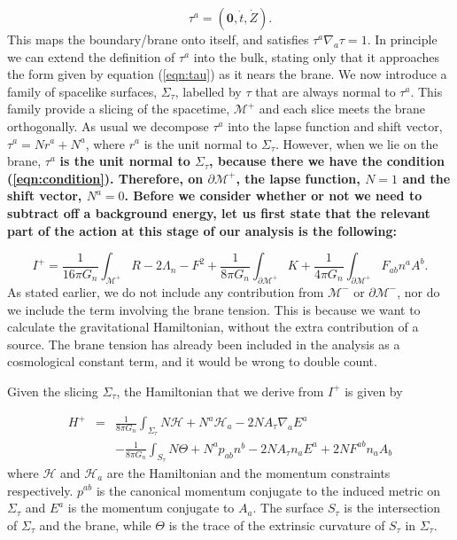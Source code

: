 \documentclass[a4paper,12pt]{article}
\begin{document}
\begin{equation} \label{eqn:tau}
\tau^a=(\mathbf{0}, \dot{t}, \dot{Z}).
\end{equation}
This maps the boundary/brane onto itself, and satisfies $\tau^a
\nabla_a \tau=1$.  In principle we can extend the definition of
$\tau^a$ into the bulk, stating only that it approaches the form given
by equation (\ref{eqn:tau}) as it nears the brane. We now introduce a
family of spacelike surfaces, $\Sigma_\tau$, labelled by $\tau$ that
are always normal to $\tau^a$. This family provide a slicing of the
spacetime, $\mathcal{M}^+$ and each slice meets the brane
orthogonally. As usual we decompose $\tau^a$ into the lapse function
and shift vector, $\tau^a=N r^a +N^a$, where $r^a$ is the unit normal
to $\Sigma_\tau$. However, when we lie on the brane, $\tau^a$ \bf{is}
\rm the unit normal to $\Sigma_\tau$, because there we have the
condition (\ref{eqn:condition}). Therefore, on $\partial
\mathcal{M}^+$, the lapse function, $N=1$ and the shift vector,
$N^a=0$. Before we consider whether or not we need to subtract off a
background energy, let us first state that the relevant part of the
action at this stage of our analysis is the following:

\begin{equation}
I^+ =  \frac{1}{16\pi G_n}\int_{\mathcal{M}^+} R - 2\Lambda_n - F^2 +
\frac{1}{8\pi G_n}\int_{\partial \mathcal{M}^+}  K  + \frac{1}{4\pi
G_n}\int_{\partial\mathcal{M}^+} F_{a b} n^a A^b.
\end{equation}
As stated earlier, we do not include any contribution from
$\mathcal{M}^-$ or $\partial \mathcal{M}^-$, nor do we include the
term involving the brane tension. This is because we want to calculate
the gravitational Hamiltonian, without the extra contribution of a
source. The brane tension has already been included in the analysis as
a cosmological constant term, and it would be wrong to double count.

Given the slicing $\Sigma_\tau$, the Hamiltonian that we derive from
$I^+$ is given by

\begin{eqnarray} \label{eqn:hamiltonian}
H^+ &=& \frac{1}{8 \pi G_n} \int_{\Sigma_{\tau}} N\mathcal{H} + N^a
\mathcal{H}_a - 2NA_{\tau} \nabla_a E^a \nonumber \\ & & -\frac{1}{8
\pi G_n} \int_{S_{\tau}} N \Theta + N^a p_{ab}n^b - 2NA_{\tau}n_a E^a
+ 2NF^{ab}n_aA_b
\end{eqnarray}
where $\mathcal{H}$ and $\mathcal{H}_a$ are the Hamiltonian and the
momentum constraints respectively. $p^{ab}$ is the canonical momentum
conjugate to the induced metric on $\Sigma_{\tau}$ and $E^a$ is the
momentum conjugate to $A_a$.  The surface $S_\tau$ is the intersection
of $\Sigma_{\tau}$ and the brane, while $\Theta$ is the trace of the
extrinsic curvature of $S_{\tau}$ in $\Sigma_\tau$.
\end{document}
